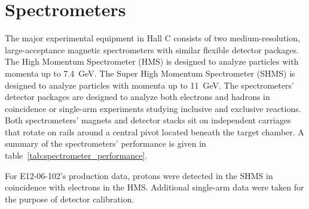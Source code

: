 \section{Spectrometers}
The major experimental equipment in Hall C consists of two medium-resolution,
large-acceptance magnetic spectrometers with similar flexible detector
packages.
The High Momentum Spectrometer (HMS) is designed to analyze particles with
momenta up to \SI{7.4}{\giga\electronvolt}.
The Super High Momentum Spectrometer (SHMS) is designed to analyze particles
with momenta up to \SI{11}{\giga\electronvolt}.
The spectrometers' detector packages are designed to analyze both electrons
and hadrons in coincidence or single-arm experiments studying inclusive and
exclusive reactions.
Both spectrometers' magnets and detector stacks sit on independent carriages
that rotate on rails around a central pivot located beneath the target chamber.
A summary of the spectrometers' performance is given in
table~\ref{tab:spectrometer_performance}.


For E12-06-102's production data, protons were detected in the SHMS in
coincidence with electrons in the HMS.
Additional single-arm data were taken for the purpose of detector calibration.

